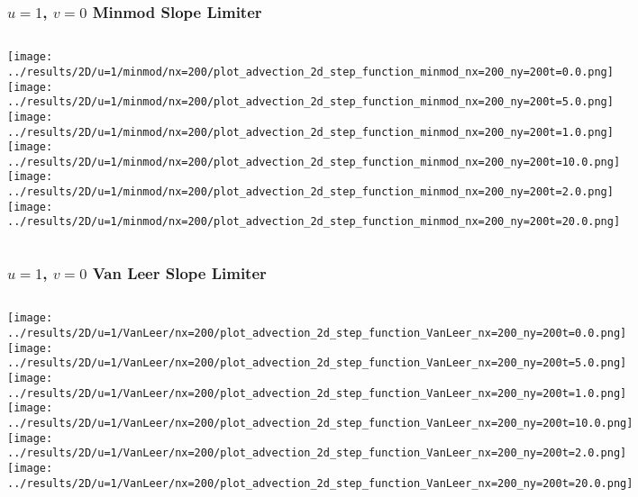 \begin{frame}
	\frametitle{$u = 1$, $v = 0$ Minmod Slope Limiter}
	\begin{columns}
		\centering
		\texttt{[image: ../results/2D/u=1/minmod/nx=200/plot\_advection\_2d\_step\_function\_minmod\_nx=200\_ny=200t=0.0.png]}\\
		\texttt{[image: ../results/2D/u=1/minmod/nx=200/plot\_advection\_2d\_step\_function\_minmod\_nx=200\_ny=200t=5.0.png]}
		\centering
		\texttt{[image: ../results/2D/u=1/minmod/nx=200/plot\_advection\_2d\_step\_function\_minmod\_nx=200\_ny=200t=1.0.png]}\\
		\texttt{[image: ../results/2D/u=1/minmod/nx=200/plot\_advection\_2d\_step\_function\_minmod\_nx=200\_ny=200t=10.0.png]}
		\centering
		\texttt{[image: ../results/2D/u=1/minmod/nx=200/plot\_advection\_2d\_step\_function\_minmod\_nx=200\_ny=200t=2.0.png]}\\
		\texttt{[image: ../results/2D/u=1/minmod/nx=200/plot\_advection\_2d\_step\_function\_minmod\_nx=200\_ny=200t=20.0.png]}
	\end{columns}
\end{frame}




\begin{frame}
	\frametitle{$u = 1$, $v = 0$ Van Leer Slope Limiter}
	\begin{columns}
		\column{.33\textwidth}
		\centering
		\texttt{[image: ../results/2D/u=1/VanLeer/nx=200/plot\_advection\_2d\_step\_function\_VanLeer\_nx=200\_ny=200t=0.0.png]}\\
		\texttt{[image: ../results/2D/u=1/VanLeer/nx=200/plot\_advection\_2d\_step\_function\_VanLeer\_nx=200\_ny=200t=5.0.png]}
		\column{.33\textwidth}
		\centering
		\texttt{[image: ../results/2D/u=1/VanLeer/nx=200/plot\_advection\_2d\_step\_function\_VanLeer\_nx=200\_ny=200t=1.0.png]}\\
		\texttt{[image: ../results/2D/u=1/VanLeer/nx=200/plot\_advection\_2d\_step\_function\_VanLeer\_nx=200\_ny=200t=10.0.png]}
		\column{.33\textwidth}
		\centering
		\texttt{[image: ../results/2D/u=1/VanLeer/nx=200/plot\_advection\_2d\_step\_function\_VanLeer\_nx=200\_ny=200t=2.0.png]}\\
		\texttt{[image: ../results/2D/u=1/VanLeer/nx=200/plot\_advection\_2d\_step\_function\_VanLeer\_nx=200\_ny=200t=20.0.png]}
	\end{columns}
\end{frame}



